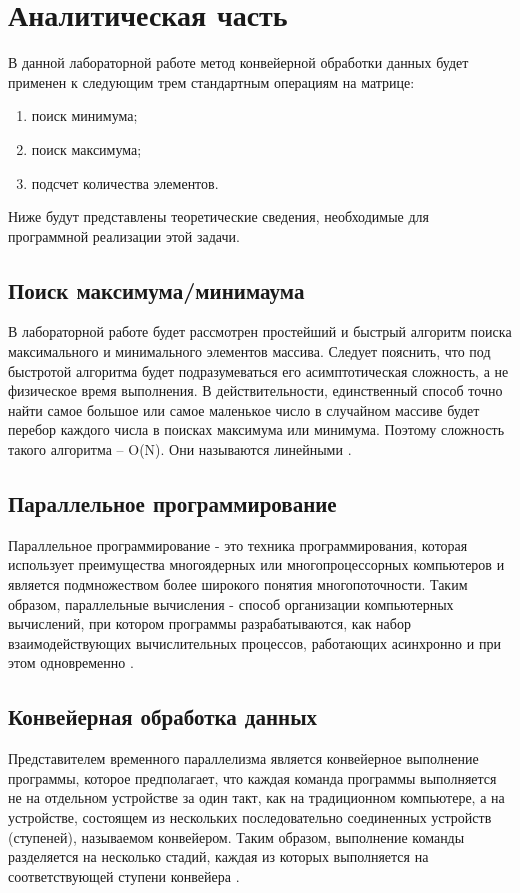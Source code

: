 \documentclass[12pt]{report}
\begin{document}
\chapter{Аналитическая часть}
 
 В данной лабораторной работе метод конвейерной обработки данных будет применен к следующим трем стандартным операциям на матрице:
\begin{enumerate}
\item поиск минимума;
\item поиск максимума;
\item подсчет количества элементов.
\end{enumerate}
  Ниже будут представлены теоретические сведения, необходимые для программной реализации этой задачи.
 
 \section{Поиск максимума/минимаума} 
  В лабораторной работе будет рассмотрен простейший и быстрый алгоритм поиска максимального и минимального элементов массива. Следует пояснить, что под быстротой алгоритма будет подразумеваться его асимптотическая сложность, а не физическое время выполнения. В действительности, единственный способ точно найти самое большое или самое маленькое число в случайном массиве будет перебор каждого числа в поисках максимума или минимума. Поэтому сложность такого алгоритма – O(N). Они называются линейными \cite{MaxMin}.
  
\section{Параллельное программирование}

Параллельное программирование - это техника программирования, которая использует преимущества многоядерных или многопроцессорных компьютеров и является подмножеством более широкого понятия многопоточности. Таким образом, параллельные вычисления - способ организации компьютерных вычислений, при котором программы разрабатываются, как набор взаимодействующих вычислительных процессов, работающих асинхронно и при этом одновременно \cite{MicrosoftPar}.
  
 \section{Конвейерная обработка данных}

Представителем временного параллелизма является конвейерное выполнение программы, которое предполагает, что каждая команда программы выполняется не на отдельном устройстве за один такт, как на традиционном компьютере, а на устройстве, состоящем из нескольких последовательно соединенных устройств (ступеней), называемом конвейером. Таким образом, выполнение команды разделяется на несколько стадий, каждая из которых выполняется на соответствующей ступени конвейера \cite{Conveyer}.
\end{document}
